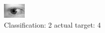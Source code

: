 \begin{figure}[h!]
\begin{center}
\includegraphics[width=0.60\columnwidth]{figures/ID798_class_2_target_4.png}
\end{center}
\caption{ Classification: 2 actual target: 4}
\label{fig:ID798_class_2_target_4}
\end{figure}
